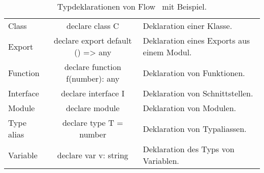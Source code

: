 \begin{longtabuenv}
\begin{longtabu} to 
    \midrule
     &  &  \\
    \midrule
  \endhead
    \midrule
    \caption{Typdeklarationen von Flow~\autocite{FLOW:LIBRARY_DEFINITIONS} mit Beispiel.}
  \endfoot
  Class       & declare class C {}               & Deklaration einer Klasse. \medskip\\
  Export      & declare export default () => any & Deklaration eines Exports aus einem Modul. \medskip\\
  Function    & declare function f(number): any  & Deklaration von Funktionen. \medskip\\
  Interface   & declare interface I {}           & Deklaration von Schnittstellen. \medskip\\
  Module      & declare module  {} & Deklaration von Modulen. \medskip\\
  Type alias  & declare type T = number          & Deklaration von Typaliassen. \medskip\\
  Variable    & declare var v: string            & Deklaration des Typs von Variablen. \medskip
  \label{tab:flow-type-declarations}
\end{longtabu}
\end{longtabuenv}
